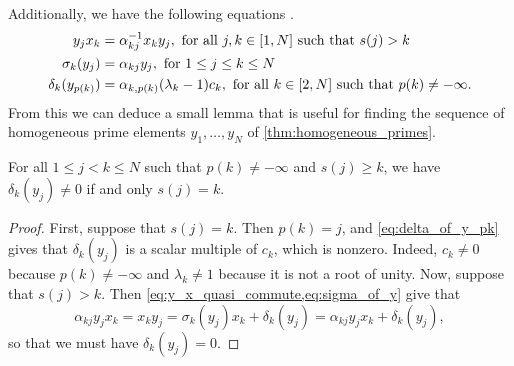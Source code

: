 Additionally, we have the following equations \cite[eq. (3.24) to
	(3.26)]{GoodearlYakimov2017QCA}.
\begin{align}\label{eq:y_x_quasi_commute}
	y_j x_k            & = \alpha_{kj}^{-1} x_k y_j, \text{ for all } j, k \in [1, N] \text{ such that } s(j) > k                                             \\
	\sigma_k (y_j)     & = \alpha_{kj}y_j, \text{ for } 1 \leq j \leq k \leq N \label{eq:sigma_of_y}                                                         \\
	\delta_k(y_{p(k)}) & = \alpha_{k, p(k)}(\lambda_k - 1)c_k, \text{ for all } k \in [2, N] \text{ such that } p(k) \neq - \infty \label{eq:delta_of_y_pk}.
\end{align}
%
From this we can deduce a small lemma that is useful for finding the sequence of
homogeneous prime elements $y_1, \dots, y_N$ of \cref{thm:homogeneous_primes}.
\begin{lemma}\label{lem:delta_nonzero_iff_predecessor}
	For all $1 \leq j < k \leq N$ such that $p(k) \neq -\infty$ and $s(j) \geq k$, we have $\delta_k(y_j) \neq 0$ if and only $s(j) = k$.
\end{lemma}
\begin{proof}
	First, suppose that $s(j) = k$. Then $p(k) = j$, and \cref{eq:delta_of_y_pk} gives that $\delta_k(y_j)$ is a scalar multiple of $c_k$, which is nonzero. Indeed, $c_k \neq 0$ because $p(k) \neq -\infty$ and $\lambda_k \neq 1$ because it is not a root of unity. Now, suppose that $s(j) > k$. Then \cref{eq:y_x_quasi_commute,eq:sigma_of_y} give that
	\begin{equation*}
		\alpha_{kj}y_jx_k = x_k y_j = \sigma_k(y_j) x_k + \delta_k(y_j) = \alpha_{kj}y_j x_k + \delta_k(y_j),
	\end{equation*}
	so that we must have $\delta_k(y_j) = 0$.
\end{proof}

